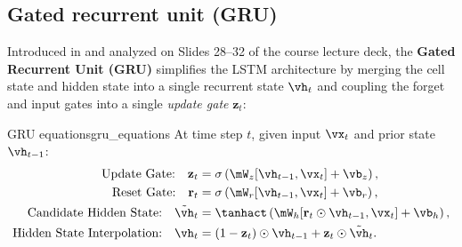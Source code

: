 \documentclass[../../main.tex]{subfiles}
\begin{document}
\subsection{Gated recurrent unit (GRU)}
Introduced in \cite{cho2014} and analyzed on Slides 28--32 of the course lecture deck, the \textbf{Gated Recurrent Unit (GRU)} simplifies the LSTM architecture by merging the cell state and hidden state into a single recurrent state $\vh_t$ and coupling the forget and input gates into a single \emph{update gate} $\mathbf{z}_t$:

\begin{definition}{GRU equations}{gru_equations}
At time step $t$, given input $\vx_t$ and prior state $\vh_{t-1}$:
\begin{align}
\text{Update Gate:} \quad \mathbf{z}_t &= \sigma\left( \mW_z [\vh_{t-1}, \vx_t] + \vb_z \right), \label{eq:gru_update} \\
\text{Reset Gate:} \quad \mathbf{r}_t &= \sigma\left( \mW_r [\vh_{t-1}, \vx_t] + \vb_r \right), \label{eq:gru_reset} \\
\text{Candidate Hidden State:} \quad \tilde{\vh}_t &= \tanhact\left( \mW_h [\mathbf{r}_t \odot \vh_{t-1}, \vx_t] + \vb_h \right), \label{eq:gru_candidate} \\
\text{Hidden State Interpolation:} \quad \vh_t &= (1 - \mathbf{z}_t) \odot \vh_{t-1} + \mathbf{z}_t \odot \tilde{\vh}_t. \label{eq:gru_hidden}
\end{align}
\end{definition}
\end{document}
